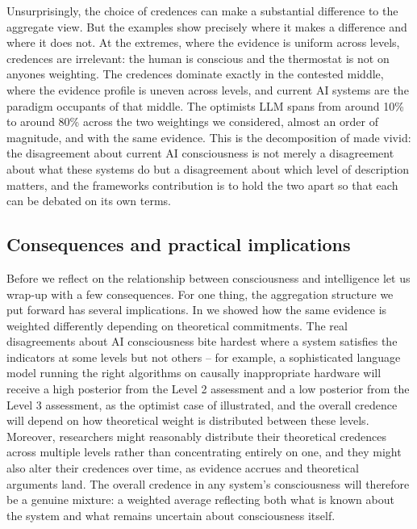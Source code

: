 \documentclass[11pt, a4paper, onecolumn, gdm]{google}
\begin{document}
Unsurprisingly, the choice of credences can make a substantial difference to the aggregate view.
But the examples show precisely where it makes a difference and where it does not.
At the extremes, where the evidence is uniform across levels, credences are irrelevant: the human is conscious and the thermostat is not on anyone\textquotesingle s weighting.
The credences dominate exactly in the contested middle, where the evidence profile is uneven across levels, and current AI systems are the paradigm occupants of that middle.
The optimist\textquotesingle s LLM spans from around 10\% to around 80\% across the two weightings we considered, almost an order of magnitude, and with the same evidence.
This is the decomposition of  made vivid: the disagreement about current AI consciousness is not merely a disagreement about what these systems do but a disagreement about which level of description matters, and the framework\textquotesingle s contribution is to hold the two apart so that each can be debated on its own terms.

\subsection{Consequences and practical implications}\label{consequences-and-practical-implications}

Before we reflect on the relationship between consciousness and intelligence let us wrap-up with a few consequences.
For one thing, the aggregation structure we put forward has several implications.
In  we showed how the same evidence is weighted differently depending on theoretical commitments.
The real disagreements about AI consciousness bite hardest where a system satisfies the indicators at some levels but not others -- for example, a sophisticated language model running the right algorithms on causally inappropriate hardware will receive a high posterior from the Level 2 assessment and a low posterior from the Level 3 assessment, as the optimist case of  illustrated, and the overall credence will depend on how theoretical weight is distributed between these levels.
Moreover, researchers might reasonably distribute their theoretical credences across multiple levels rather than concentrating entirely on one, and they might also alter their credences over time, as evidence accrues and theoretical arguments land. The overall credence in any system's consciousness will therefore be a genuine mixture: a weighted average reflecting both what is known about the system and what remains uncertain about consciousness itself.
\end{document}
